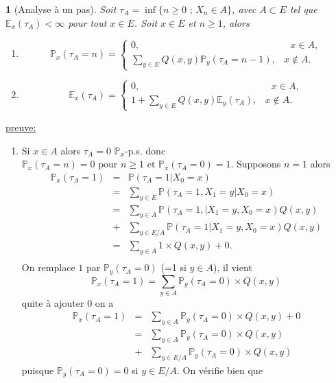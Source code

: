 \documentclass[8pt,notheorems]{beamer}
\def \E{\mathbb E}
\def \P {\mathbb P}
\renewcommand{\Pr}{\mathbb{P}}
\newtheorem{prop}{\translate{Proposition}}
\theoremstyle{definition}
\theoremstyle{example}
\theoremstyle{mystyle}
\theoremstyle{plain}
\begin{document}
\begin{frame}[allowframebreaks]

\begin{prop}[Analyse à un pas]
Soit $\tau_A=\inf\{n\geq0\text{ ; }X_n\in A\}$, avec $A\subset E$ tel que $\E_x(\tau_A)<\infty$ pour tout $x\in E$. Soit $x\in E$ et $n\geq1$, alors
\begin{enumerate}
\item
$$
\Pr_x(\tau_A=n)=
\begin{cases}
0,&\text{ }x\in A,\\
\sum_{y\in E}Q(x,y)\Pr_y(\tau_A=n-1),&x\notin A.
\end{cases}
$$
\item
$$
\E_x(\tau_A)=
\begin{cases}
0,&\text{ }x\in A,\\
1+\sum_{y\in E}Q(x,y)\E_y(\tau_A),&x\notin A.
\end{cases}
$$
\end{enumerate}
\end{prop}
\underline{preuve:}\\
\begin{enumerate}
    \item Si $x\in A$ alors $\tau_A = 0$ $\P_x$-p.s. donc
    $\Pr_x(\tau_A=n)=0\text{ pour }n\geq1\text{ et }\Pr_x(\tau_A=0)=1$.
    Supposons $n = 1$ alors
    \begin{eqnarray*}
        \P_x(\tau_A=1)&=&\P(\tau_A=1|X_0=x)\\
        &=&\sum_{y\in E} \P(\tau_A=1, X_1=y|X_0=x)\\
        &=&\sum_{y\in A} \P(\tau_A=1, |X_1=y,X_0=x)Q(x,y) \\
        &+& \sum_{y\in E/A} \P(\tau_A=1|X_1=y,X_0=x)Q(x,y)\\
        &=&\sum_{y\in A} 1\times  Q(x,y) + 0.\\
    \end{eqnarray*}
    On remplace $1$ par $\Pr_y(\tau_A=0)$ (=1 si $y\in A$), il vient
    $$
    \P_x(\tau_A=1)= \sum_{y\in A} \Pr_y(\tau_A=0)\times  Q(x,y)
    $$
    quite à ajouter $0$ on a
    \begin{eqnarray*}
    \P_x(\tau_A=1)&=& \sum_{y\in A} \Pr_y(\tau_A=0)\times  Q(x,y) + 0\\
     &=&\sum_{y\in A} \Pr_y(\tau_A=0)\times  Q(x,y)\\
     &+& \sum_{y\in E/A} \Pr_y(\tau_A=0)\times  Q(x,y)
    \end{eqnarray*}
    puisque $\Pr_y(\tau_A=0) = 0$ si $y\in E/A$. On vérifie bien que
    $$
$$
\end{enumerate}
\end{frame}
\end{document}
